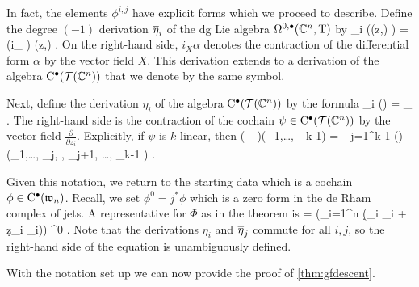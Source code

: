 \documentclass[11pt]{amsart}
\begin{document}
In fact, the elements $\phi^{i,j}$ have explicit forms which we proceed to describe. 
Define the degree $(-1)$ derivation $\Bar{\eta}_i$ of the dg Lie algebra $\Omega^{0,\bu}(\CC^n, \tangent)$ by 
\beqn\label{eqn:holdescent}
\Bar{\eta}_i \left(\alpha(z,\zbar)  \right) = \left(i_{} \alpha \right) (z,\zbar)  .
\eeqn
On the right-hand side, $i_X \alpha$ denotes the contraction of the differential form $\alpha$ by the vector field $X$. 
This derivation extends to a derivation of the algebra $\clie^\bu(\cT(\CC^n))$ that we denote by the same symbol. 

Next, define the derivation $\eta_i$ of the algebra $\clie^\bu(\cT(\CC^n))$ by the formula
\beqn\label{eqn:cartandescent}
\eta_i (\psi) = \iota_{} \psi .
\eeqn
The right-hand side is the contraction of the cochain $\psi \in \clie^\bu(\cT(\CC^n))$ by the vector field $\frac{\partial}{\partial z_i}$. 
Explicitly, if $\psi$ is $k$-linear, then 
\beqn
(\iota_{} \psi)(\xi_1,\ldots, \xi_{k-1}) = \sum_{j=1}^{k-1} (\pm) \psi\left(\xi_1,\ldots, \xi_j, , \xi_{j+1}, \ldots, \xi_{k-1} \right) .
\eeqn

Given this notation, we return to the starting data which is a cochain $\phi \in \clie^\bu(\fw_n)$.
Recall, we set $\phi^0 = j^* \phi$ which is a zero form in the de Rham complex of jets. 
A representative for $\Phi$ as in the theorem is
\beqn\label{eqn:Phi}
\Phi = \exp\left(\sum_{i=1}^n \left(\d \zbar_i \Bar{\eta}_i + \d z_i \eta_i\right)\right) \phi^0 . 
\eeqn
Note that the derivations $\eta_i$ and $\Bar{\eta}_j$ commute for all $i,j$, so the right-hand side of the equation is unambiguously defined. 

With the notation set up we can now provide the proof of \ref{thm:gfdescent}. 
\end{document}

